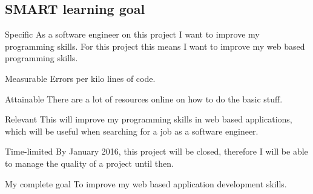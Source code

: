 \documentclass[12pt]{article}
\begin{document}
	\subsection{SMART learning goal}
	\begin{SMART}
	    \item[Specific] As a software engineer on this project I want to improve my programming skills. For this project this means I want to improve my web based programming skills.
	    \item[Measurable] Errors per kilo lines of code.
	    \item[Attainable] There are a lot of resources online on how to do the basic stuff.
	    \item[Relevant] This will improve my programming skills in web based applications, which will be useful when searching for a job as a software engineer.
	    \item[Time-limited]By January 2016, this project will be closed, therefore I will be able to manage the quality of a project until then.
	    \item[My complete goal] To improve my web based application development skills.
	\end{SMART}
	
\end{document}
